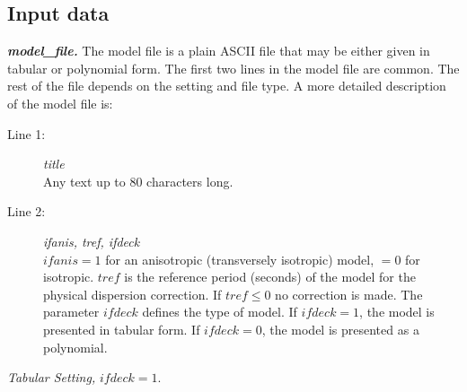 \documentclass[11pt]{article}
\begin{document}
\subsection {Input data}

\textbf{\large \emph{model\_file.}} The model file is a plain ASCII file that may be
either given in tabular or polynomial form. The first two lines in the model file 
are common. The rest of the file depends on the setting and file type. 
A more detailed description of the model file is:
\begin{description}
\item[Line 1:] {\it title} \\
Any text up to 80 characters long.
\item[Line 2:] {\it ifanis, tref, ifdeck} \\
$ifanis=1$ for an anisotropic (transversely isotropic)
model, $=0$ for isotropic. $tref$ is the reference period (seconds) of the
model for the physical dispersion correction. If $tref \leq 0$ no correction is made.
The parameter $ifdeck$ defines the type of model.
If $ifdeck=1$, the model is presented in tabular form. If $ifdeck=0$, the
model is presented as a polynomial.
\end{description}
%
%
{\large\it Tabular Setting,} {\it $ifdeck=1$}.
\end{document}
